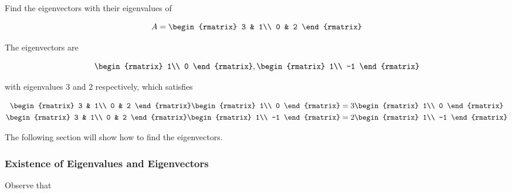 \documentclass[a4paper,12pt]{article}
\begin{document}
\begin{exm}
  Find the eigenvectors with their eigenvalues of

  $$A=\begin{rmatrix}
    3 & 1\\
    0 & 2
  \end{rmatrix}$$\s

  \ans The eigenvectors are

  $$\begin{rmatrix}
    1\\
    0
  \end{rmatrix},\begin{rmatrix}
    1\\
    -1
  \end{rmatrix}$$\s

  with eigenvalues $3$ and $2$ respectively, which satisfies

  $$\begin{aligned}[t]
    \begin{rmatrix}
      3 & 1\\
      0 & 2
    \end{rmatrix}\begin{rmatrix}
      1\\
      0
    \end{rmatrix}&=3\begin{rmatrix}
      1\\
      0
    \end{rmatrix}\\
    \begin{rmatrix}
      3 & 1\\
      0 & 2
    \end{rmatrix}\begin{rmatrix}
      1\\
      -1
    \end{rmatrix}&=2\begin{rmatrix}
      1\\
      -1
    \end{rmatrix}
  \end{aligned}$$
\end{exm}\n

The following section will show how to find the eigenvectors.

\subsubsection{Existence of Eigenvalues and Eigenvectors}
Observe that
\end{document}

